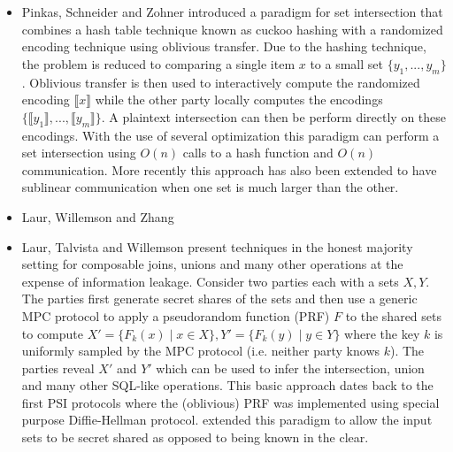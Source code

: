 \begin{itemize}
\item Pinkas, Schneider and Zohner \cite{usenix:PSZ14} introduced a paradigm for set intersection that combines a hash table technique known as cuckoo hashing with a randomized encoding technique using oblivious transfer. Due to the hashing technique, the problem is reduced to comparing a single item $x$ to a small set $\{y_1,...,y_m\}$. Oblivious transfer is then used to interactively compute the randomized encoding $\llbracket x\rrbracket$ while the other party locally computes the encodings $\{\llbracket y_1\rrbracket,...,\llbracket y_m\rrbracket \}$. A plaintext intersection can then be perform directly on these encodings. With the use of several optimization\cite{USENIX:PSSZ15,USENIX:PSZ16,CCS:KKRT16} this paradigm can perform a set intersection using $O(n)$ calls to a hash function and $O(n)$ communication. More recently this approach has also been extended\cite{CLR17} to have sublinear communication when one set is much larger than the other.

\item Laur, Willemson and Zhang\cite{LWZ11} 

\item Laur, Talvista and Willemson\cite{LTW13} present techniques in the honest majority setting for composable joins, unions and  many other operations at the expense of information leakage. Consider two parties each with a sets $X,Y$. The parties first generate secret shares of the sets and then use a generic MPC protocol to apply a pseudorandom function (PRF) $F$ to the shared sets to compute $X' = \{F_k(x) \mid x\in X\}, Y'=\{F_k(y) \mid y\in Y\}$ where the key $k$ is uniformly sampled by the MPC protocol (i.e. neither party knows $k$). The parties reveal $X'$ and $Y'$ which can be used to infer the intersection, union and many other SQL-like operations. This basic approach dates back to the first PSI protocols \cite{meadows,HFH99} where the (oblivious) PRF was implemented using special purpose Diffie-Hellman protocol. \cite{LTW13} extended this paradigm to allow the input sets to be secret shared as opposed to being known in the clear.


\end{itemize}
